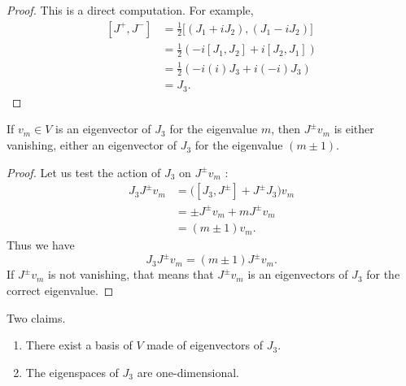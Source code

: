 \begin{proof}
    This is a direct computation. For example,
    \begin{subequations}
        \begin{align}
            [J^+,J^-]&=\frac{ 1 }{2}\big[ (J_1+iJ_2), (J_1-iJ_2) \big]\\
            &=\frac{ 1 }{2}(-i[J_1,J_2]+i[J_2,J_1])\\
            &=\frac{ 1 }{2}(-i(i)J_3+i(-i)J_3)\\
            &=J_3.
        \end{align}
    \end{subequations}
\end{proof}

\begin{lemma}
    If \( v_m\in V\) is an eigenvector of \( J_3\) for the eigenvalue \( m\), then \( J^{\pm}v_m\) is either vanishing, either an eigenvector of \( J_3\) for the eigenvalue \( (m\pm 1)\).
\end{lemma}

\begin{proof}
    Let us test the action of \( J_3\) on \( J^{\pm}v_m\) :
    \begin{subequations}
        \begin{align}
            J_3J^{\pm}v_m&=\big( [J_3,J^{\pm}]+J^{\pm}J_3 \big)v_m\\
            &=\pm J^{\pm}v_m+mJ^{\pm}v_m\\
            &=(m\pm 1)v_m.
        \end{align}
    \end{subequations}
    Thus we have
    \begin{equation}
        J_3J^{\pm}v_m=(m\pm 1)J^{\pm}v_m.
    \end{equation}
    If \( J^{\pm}v_m\) is not vanishing, that means that \( J^{\pm}v_m\) is an eigenvectors of \( J_3\) for the correct eigenvalue.
\end{proof}

\begin{lemma}
    Two claims.
    \begin{enumerate}
        \item
            There exist a basis of \( V\) made of eigenvectors of \( J_3\).
        \item
            The eigenspaces of \( J_3\) are one-dimensional.
    \end{enumerate}
\end{lemma}

